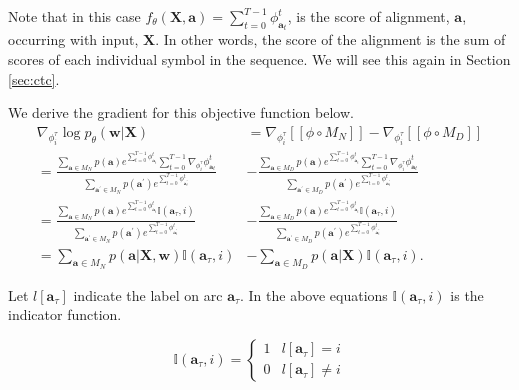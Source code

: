 Note that in this case $f_\theta\left(\mathbf{X}, \mathbf{a}\right) = \sum_{t=0}^{T-1}\phi_{\mathbf{a}_t}^t$, is the score of alignment, $\mathbf{a}$, occurring with input, $\mathbf{X}$. In other words, the score of the alignment is the sum of scores of each individual symbol in the sequence. We will see this again in Section \ref{sec:ctc}.

We derive the gradient for this objective function below. 
\begin{align}
    \nabla_{\phi_{i}^\tau} \log{ p_\theta\left(\mathbf{w} | \mathbf{X}\right)} &= \nabla_{\phi_{i}^\tau} [\![\phi \circ M_N]\!] - \nabla_{\phi_{i}^\tau} [\![\phi \circ M_D]\!] \\
    = \frac{\sum_{\mathbf{a} \in M_N} p\left(\mathbf{a}\right)e^{\sum_{t=0}^{T-1}\phi_{\mathbf{a}_t}^t} \sum_{t=0}^{T-1}\nabla_{\phi_{i}^\tau} \phi_{\mathbf{a}_t}^t}{\sum_{\mathbf{a}^\prime \in M_{N}} p\left(\mathbf{a}^\prime\right)e^{\sum_{t=0}^{T-1}\phi_{\mathbf{a}^\prime_t}^t}} &- \frac{\sum_{\mathbf{a} \in M_D} p\left(\mathbf{a}\right)e^{\sum_{t=0}^{T-1}\phi_{\mathbf{a}_t}^t} \sum_{t=0}^{T-1}\nabla_{\phi_{i}^\tau} \phi_{\mathbf{a}_t}^t}{\sum_{\mathbf{a}^\prime \in M_D} p\left(\mathbf{a}^\prime\right)e^{\sum_{t=0}^{T-1}\phi_{\mathbf{a}^\prime_t}^t}} \\
    = \frac{\sum_{\mathbf{a} \in M_N} p\left(\mathbf{a}\right)e^{\sum_{t=0}^{T-1}\phi_{\mathbf{a}_t}^t} \mathbb{I}\left(\mathbf{a}_\tau, i\right)}{\sum_{\mathbf{a}^\prime \in M_N} p\left(\mathbf{a}^\prime\right)e^{\sum_{t=0}^{T-1}\phi_{\mathbf{a}^\prime_t}^t}} &- \frac{\sum_{\mathbf{a} \in M_D} p\left(\mathbf{a}\right)e^{\sum_{t=0}^{T-1}\phi_{\mathbf{a}_t}^t} \mathbb{I}\left(\mathbf{a}_\tau, i\right)}{\sum_{\mathbf{a}^\prime \in M_D} p\left(\mathbf{a}^\prime\right)e^{\sum_{t=0}^{T-1}\phi_{\mathbf{a}^\prime_t}^t}} \\
    = \sum_{\mathbf{a} \in M_N} p\left(\mathbf{a} | \mathbf{X}, \mathbf{w}\right)\mathbb{I}\left(\mathbf{a}_\tau, i\right) &- \sum_{\mathbf{a} \in M_D} p\left(\mathbf{a} | \mathbf{X}\right)\mathbb{I}\left(\mathbf{a}_\tau, i\right).
\end{align}

Let $l\left[\mathbf{a}_\tau\right]$ indicate the label on arc $\mathbf{a}_\tau$. In the above equations $\mathbb{I}\left(\mathbf{a}_\tau, i\right)$ is the indicator function.

\begin{equation*}
\mathbb{I}\left(\mathbf{a}_\tau, i\right) =
\begin{cases} 1 & l\left[\mathbf{a}_\tau\right] = i \\ 0 & l\left[\mathbf{a}_\tau\right] \neq i \end{cases}
\end{equation*}

